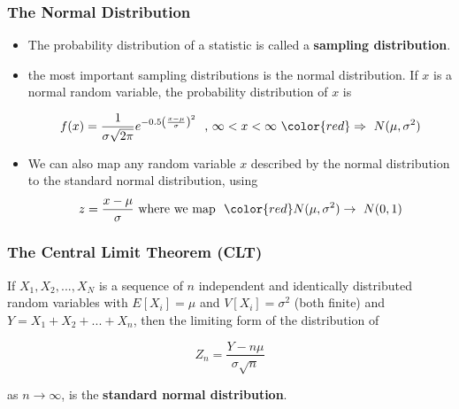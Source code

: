 \begin{frame}
    \frametitle{The Normal Distribution}

    \begin{itemize}
    
        \item The probability distribution of a statistic is called a \textbf{sampling distribution}.

        \item the most important sampling distributions is the normal distribution. 
        If $x$ is a normal random variable, the probability distribution of $x$ is

        $$f(x) = \frac{1}{\sigma\sqrt{2\pi}}e^{-0.5\left(\frac{x-\mu}{\sigma}\right)^2}~~\text{, $\infty < x < \infty$}~{\color{red}\Rightarrow~N(\mu,\sigma^2)}$$

        \item We can also map any random variable $x$ described by the normal distribution to the standard normal
        distribution, using
        $$z = \frac{x-\mu}{\sigma}~\text{where we map} ~{~\color{red}N(\mu,\sigma^2)\rightarrow~N(0,1)}$$

    \end{itemize}
\end{frame}

\begin{frame}
    \frametitle{The Central Limit Theorem (CLT)}
    \begin{definition}
        If $X_1,X_2,...,X_N$ is a sequence of $n$ independent and identically distributed 
        random variables with $E[X_i]=\mu$ and $V[X_i]=\sigma^2$ (both finite) and $Y=X_1+X_2+...+X_n$, then 
        the limiting form of the distribution of

        $$Z_n = \frac{Y-n\mu}{\sigma\sqrt{n}}$$

        as $n\rightarrow\infty$, is the \textbf{standard normal distribution}.

    \end{definition}
\end{frame}



